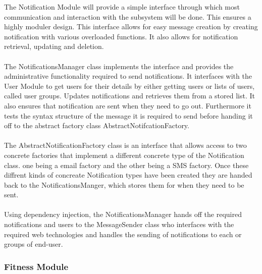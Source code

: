 \documentclass{article}
\begin{document}
			{The Notification Module will provide a simple interface through which most communication and interaction with the subsystem will be done. This ensures a highly moduler design. This interface allows for easy message creation by creating notification with various overloaded functions. It also allows for notification retrieval, updating and deletion.\\ \\The NotificationsManager class implements the interface and provides the administrative functionality required to send notifications. It interfaces with the User Module to get users for their details by either getting users or lists of users, called user groups. Updates notifications and retrieves them from a stored list. It also ensures that notification are sent when they need to go out. Furthermore it tests the syntax structure of the message it is required to send before handing it off to the abstract factory class AbstractNotifcationFactory.\\ \\The AbstractNotificationFactory class is an interface that allows access to two concrete factories that implement a different concrete type of the Notification class. one being a email factory and the other being a SMS factory. Once these diffrent kinds of concreate Notification types have been created they are handed back to the NotificationsManger, which stores them for when they need to be sent.\\\\Using dependency injection, the NotificationsManager hands off the required notifications and users to the MessageSender class who interfaces with the required web technologies and handles the sending of notifications to each  or groups of end-user.}
		\subsubsection{Fitness Module}
\end{document}
